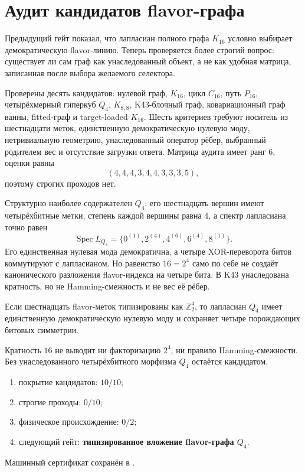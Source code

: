 \chapter{Аудит кандидатов flavor-графа}
\label{ch:v10-discrete-resolution-flavor-graph-audit}

Предыдущий гейт показал, что лапласиан полного графа $K_{16}$ условно
выбирает демократическую flavor-линию. Теперь проверяется более строгий
вопрос: существует ли сам граф как унаследованный объект, а не как удобная
матрица, записанная после выбора желаемого селектора.

Проверены десять кандидатов: нулевой граф, $K_{16}$, цикл $C_{16}$, путь
$P_{16}$, четырёхмерный гиперкуб $Q_4$, $K_{8,8}$, K43-блочный граф,
ковариационный граф ванны, fitted-граф и target-loaded $K_{16}$. Шесть
критериев требуют носитель из шестнадцати меток, единственную
демократическую нулевую моду, нетривиальную геометрию, унаследованный
оператор рёбер, выбранный родителем вес и отсутствие загрузки ответа.
Матрица аудита имеет ранг $6$, оценки равны
\begin{equation}
 (4,4,4,3,4,4,3,3,3,5),
\end{equation}
поэтому строгих проходов нет.

Структурно наиболее содержателен $Q_4$: его шестнадцать вершин имеют
четырёхбитные метки, степень каждой вершины равна $4$, а спектр лапласиана
точно равен
\begin{equation}
 \operatorname{Spec}L_{Q_4}=\{0^{(1)},2^{(4)},4^{(6)},6^{(4)},8^{(1)}\}.
\end{equation}
Его единственная нулевая мода демократична, а четыре XOR-переворота битов
коммутируют с лапласианом. Но равенство $16=2^4$ само по себе не создаёт
канонического разложения flavor-индекса на четыре бита. В K43 унаследована
кратность, но не Hamming-смежность и не вес её рёбер.

\begin{theorem}
Если шестнадцать flavor-меток типизированы как $\mathbb Z_2^4$, то
лапласиан $Q_4$ имеет единственную демократическую нулевую моду и сохраняет
четыре порождающих битовых симметрии.
\end{theorem}
\begin{nogocriterion}
Кратность $16$ не выводит ни факторизацию $2^4$, ни правило Hamming-смежности.
Без унаследованного четырёхбитного морфизма $Q_4$ остаётся кандидатом.
\end{nogocriterion}
\begin{protocol}\begin{enumerate}
\item покрытие кандидатов: \textbf{$10/10$};
\item строгие проходы: \textbf{$0/10$};
\item физическое происхождение: \textbf{$0/2$};
\item следующий гейт: \textbf{типизированное вложение flavor-графа $Q_4$}.
\end{enumerate}\end{protocol}
Машинный сертификат сохранён в
.
